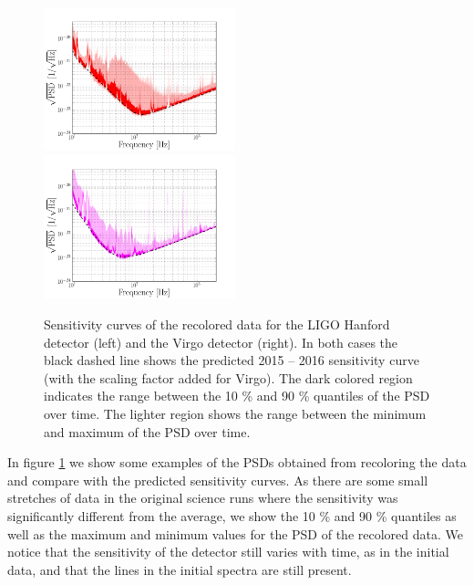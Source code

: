 \documentclass[12pt]{iopart}
\begin{document}
\begin{figure}
\centering
\includegraphics[width=0.495\textwidth]
{figure3A.png}
\includegraphics[width=0.495\textwidth]
{figure3B.png}
\caption{\label{fig:NOISE_recolored_sens}
Sensitivity curves of the recolored data for the LIGO Hanford detector (left)
and the Virgo detector (right). In both cases the black dashed line shows the
predicted 2015 -- 2016 sensitivity curve (with the scaling factor added for
Virgo). The dark colored region indicates the range between the 10 \% and 90 \%
quantiles of the PSD over time. The lighter region shows the range
between the minimum and maximum of the PSD over time.}
\end{figure}

In figure \ref{fig:NOISE_recolored_sens} we show some examples of the PSDs
obtained from recoloring the data and compare with
the predicted sensitivity curves. As there are some small stretches of data in
the original science runs where the sensitivity was significantly different
from the average, we show the 10 \% and 90 \% quantiles as well as the maximum 
and
minimum values for the PSD of the recolored data. We notice that the sensitivity
of the detector still varies with time, as in the initial data, and that the
lines in the initial spectra are still present.
\end{document}
